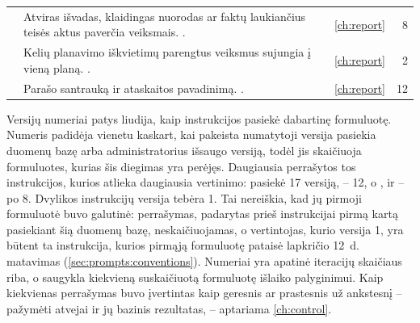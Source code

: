 \begin{xltabular}{\textwidth}{@{}L{40mm}YL{21mm}L{17mm}r@{}}
 & Atviras išvadas, klaidingas nuorodas ar faktų laukiančius teisės aktus paverčia veiksmais. . &  & \cref{ch:report} & 8 \\
 & Kelių planavimo iškvietimų parengtus veiksmus sujungia į vieną planą. . &  & \cref{ch:report} & 2 \\
 & Parašo santrauką ir ataskaitos pavadinimą. . &  & \cref{ch:report} & 12 \\
\end{xltabular}

Versijų numeriai patys liudija, kaip instrukcijos pasiekė dabartinę formuluotę. Numeris padidėja
vienetu kaskart, kai pakeista numatytoji versija pasiekia duomenų bazę arba administratorius
išsaugo versiją, todėl jis skaičiuoja formuluotes, kurias šis diegimas yra perėjęs. Daugiausia
perrašytos tos instrukcijos, kurios atlieka daugiausia vertinimo:  pasiekė 17
versiją,  -- 12, o ,
 ir  -- po 8. Dvylikos instrukcijų versija tebėra
1. Tai nereiškia, kad jų pirmoji formuluotė buvo galutinė: perrašymas, padarytas prieš
instrukcijai pirmą kartą pasiekiant šią duomenų bazę, neskaičiuojamas, o vertintojas, kurio
versija 1, yra būtent ta instrukcija, kurios pirmąją formuluotę pataisė lapkričio 12~d.
matavimas (\cref{sec:prompts:conventions}). Numeriai yra apatinė iteracijų skaičiaus riba, o
saugykla kiekvieną suskaičiuotą formuluotę išlaiko palyginimui. Kaip kiekvienas perrašymas buvo
įvertintas kaip geresnis ar prastesnis už ankstesnį -- pažymėti atvejai ir jų bazinis
rezultatas, -- aptariama \cref{ch:control}.
